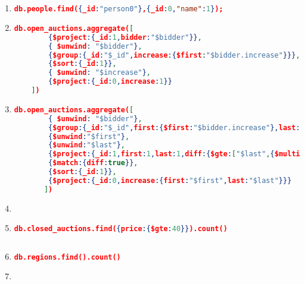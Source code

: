 \label{xmark-queries-mongodb}
\begin{enumerate}[label=Q\arabic*]
	\item \label{mongodb-q-1}%
	\begin{lstlisting}[language=JSON,  basicstyle=\scriptsize]
		db.people.find({_id:"person0"},{_id:0,"name":1});
	\end{lstlisting}
	
	\item \label{mongodb-q-2}%
	\begin{lstlisting}[language=JSON,  basicstyle=\scriptsize]
	db.open_auctions.aggregate([
		{$project:{_id:1,bidder:"$bidder"}},
		{ $unwind: "$bidder"},
		{$group:{_id:"$_id",increase:{$first:"$bidder.increase"}}},
		{$sort:{_id:1}},
		{ $unwind: "$increase"},
		{$project:{_id:0,increase:1}}
	])
	\end{lstlisting}
	
    \item \label{mongodb-q-3}%
	\begin{lstlisting}[language=JSON,   basicstyle=\scriptsize]
	   db.open_auctions.aggregate([
		{ $unwind: "$bidder"},
		{$group:{_id:"$_id",first:{$first:"$bidder.increase"},last:{$last:"$bidder.increase"}}},
		{$unwind:"$first"},
		{$unwind:"$last"},
		{$project:{_id:1,first:1,last:1,diff:{$gte:["$last",{$multiply:["$first",2]}]}}},
		{$match:{diff:true}},
		{$sort:{_id:1}},
		{$project:{_id:0,increase:{first:"$first",last:"$last"}}}
	   ])
	\end{lstlisting}
	
    \item %
	\par
	
	
    \item \label{mongodb-q-5}%
	\begin{lstlisting}[language=JSON,   basicstyle=\scriptsize]
	   db.closed_auctions.find({price:{$gte:40}}).count()
	   
	\end{lstlisting}
	
    \item \label{mongodb-q-6}%
	\begin{lstlisting}[language=JSON,   basicstyle=\scriptsize]
	   db.regions.find().count()
	\end{lstlisting}
	
	
    \item %
	\par
	

\end{enumerate}
